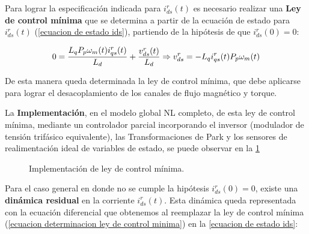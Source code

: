 \documentclass[a4paper, 10pt, onecolumn,journal]{ieeeconf}
\begin{document}
Para lograr la especificación indicada para $i^r_{ds}(t)$ es necesario realizar una \textbf{Ley de control mínima} que se determina a partir de la ecuación de estado para $i^{r}_{ds}(t)$ (\cref{ecuacion de estado ids}), partiendo de la hipótesis de que $i^{r}_{ds}(0)=0$:

\begin{equation}
	0= \frac{L_q P_p \omega_m(t)i^r_{qs}(t)}{L_d}  + \frac{v^r_{ds}(t)}{L_d}\Rightarrow	v^{r}_{ds}= -L_{q}i^{r}_{qs}(t)P_{p}\omega_{m}(t)\\
	\label{ecuacion determinacion ley de control minima}
\end{equation}

De esta manera queda determinada la ley de control mínima, que debe aplicarse para lograr el desacoplamiento de los canales de flujo magnético y torque.

La \textbf{Implementación}, en el modelo global NL completo, de esta  ley de control mínima, mediante un controlador parcial incorporando el inversor (modulador de tensión trifásico equivalente), las Transformaciones de Park y los sensores de realimentación ideal de variables de estado,
se puede observar en la \cref{Implementación de ley de control mínima}

\begin{figure}[H]
	\centering
	\begin{adjustbox}{scale=0.7,max width=\columnwidth}
	\end{adjustbox}
	\caption{Implementación de ley de control mínima.}
	\label{Implementación de ley de control mínima}
\end{figure}

Para el caso general en donde no se cumple la hipótesis $i^{r}_{ds}(0)=0$, existe una \textbf{dinámica residual} en la corriente $i^{r}_{ds}(t)$. Esta dinámica queda representada con la ecuación diferencial que obtenemos al reemplazar la ley de control mínima (\cref{ecuacion determinacion ley de control minima}) en la \cref{ecuacion de estado ids}:
\end{document}

